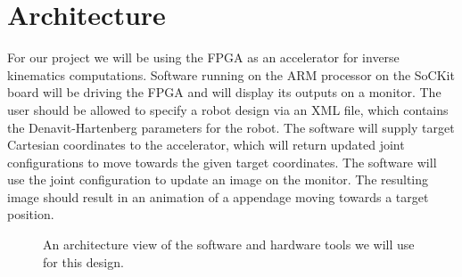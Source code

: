 \section{Architecture}

For our project we will be using the FPGA as an accelerator for
inverse kinematics computations. Software running on the ARM processor 
on the SoCKit board will be driving the FPGA and will display its outputs on 
a monitor. The user should be allowed to specify a robot design via an XML file, which contains the Denavit-Hartenberg parameters for the robot. The software will supply target Cartesian coordinates 
to the accelerator, which will return updated joint configurations to 
move towards the given target coordinates. The software will use the 
joint configuration to update an image on the monitor. The resulting 
image should result in an animation of a appendage moving towards a target 
position.

\begin{figure}[ht]
\center
{}
\caption{An architecture view of the software and hardware tools we will use for this design.}
\label{fig:toolchain}
\end{figure}